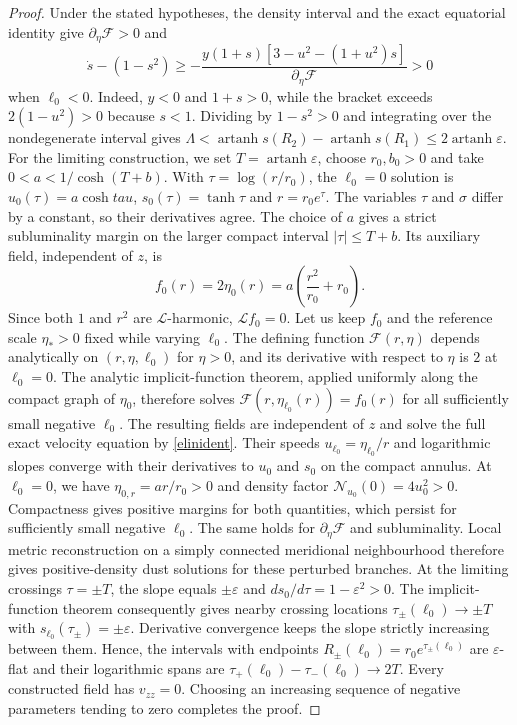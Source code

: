 \documentclass[amsmath,amsfonts,amssymb,aps,pra,superscriptaddress,10pt]{revtex4-2}
\numberwithin{equation}{section}
\theoremstyle{plain}
\theoremstyle{definition}
\theoremstyle{remark}
\theoremstyle{definition}
\newcommand{\ellzero}{\ell_0}
\begin{document}
\begin{proof}
Under the stated hypotheses, the density interval and the exact equatorial identity give $\partial_\eta\mathcal{F}>0$ and
\begin{equation}
\dot{s}-(1-s^2)\geq-\frac{y(1+s)[3-u^2-(1+u^2)s]}{\partial_\eta\mathcal{F}}>0
\end{equation}
when $\ellzero<0$. Indeed, $y<0$ and $1+s>0$, while the bracket exceeds $2(1-u^2)>0$ because $s<1$. Dividing by $1-s^2>0$ and integrating over the nondegenerate interval gives $\Lambda<\operatorname{artanh}{s(R_2)}-\operatorname{artanh}{s(R_1)}\leq 2\operatorname{artanh}{\varepsilon}$. For the limiting construction, we set $T=\operatorname{artanh}{\varepsilon}$, choose $r_0,b_0>0$ and take $0<a<1/\cosh{(T+b)}$. With $\tau=\log{(r/r_0)}$, the $\ellzero=0$ solution is $u_0(\tau)=a\cosh{tau}$, $s_0(\tau)=\tanh{\tau}$ and $r=r_0 e^\tau$. The variables $\tau$ and $\sigma$ differ by a constant, so their derivatives agree. The choice of $a$ gives a strict subluminality margin on the larger compact interval $|\tau|\leq T+b$. Its auxiliary field, independent of $z$, is
\begin{equation}
f_0(r)=2\eta_0(r)=a\left(\frac{r^2}{r_0}+r_0\right).
\end{equation}
Since both $1$ and $r^2$ are $\mathcal{L}$-harmonic, $\mathcal{L}f_0=0$. Let us keep $f_0$ and the reference scale $\eta_*>0$ fixed while varying $\ellzero$. The defining function $\mathcal{F}(r,\eta)$ depends analytically on $(r,\eta,\ellzero)$ for $\eta>0$, and its derivative with respect to $\eta$ is $2$ at $\ellzero=0$. The analytic implicit-function theorem, applied uniformly along the compact graph of $\eta_0$, therefore solves $\mathcal{F}(r,\eta_{\ellzero}(r))=f_0(r)$ for all sufficiently small negative $\ellzero$. The resulting fields are independent of $z$ and solve the full exact velocity equation by \eqref{elinident}. Their speeds $u_{\ellzero}=\eta_{\ellzero}/r$ and logarithmic slopes converge with their derivatives to $u_0$ and $s_0$ on the compact annulus. At $\ellzero=0$, we have $\eta_{0,r}=ar/r_0>0$ and density factor $\mathcal{N}_{u_0}(0)=4u_0^2>0$. Compactness gives positive margins for both quantities, which persist for sufficiently small negative $\ellzero$. The same holds for $\partial_\eta\mathcal{F}$ and subluminality. Local metric reconstruction on a simply connected meridional neighbourhood therefore gives positive-density dust solutions for these perturbed branches. At the limiting crossings $\tau=\pm T$, the slope equals $\pm\varepsilon$ and $ds_0/d\tau=1-\varepsilon^2>0$. The implicit-function theorem consequently gives nearby crossing locations $\tau_\pm(\ellzero)\to\pm T$ with $s_{\ellzero}(\tau_\pm)=\pm\varepsilon$. Derivative convergence keeps the slope strictly increasing between them. Hence, the intervals with endpoints $R_\pm(\ellzero)=r_0 e^{\tau_\pm(\ellzero)}$ are $\varepsilon$-flat and their logarithmic spans are $\tau_+(\ellzero)-\tau_-(\ellzero)\to 2T$. Every constructed field has $v_{zz}=0$. Choosing an increasing sequence of negative parameters tending to zero completes the proof.
\end{proof}
\end{document}
